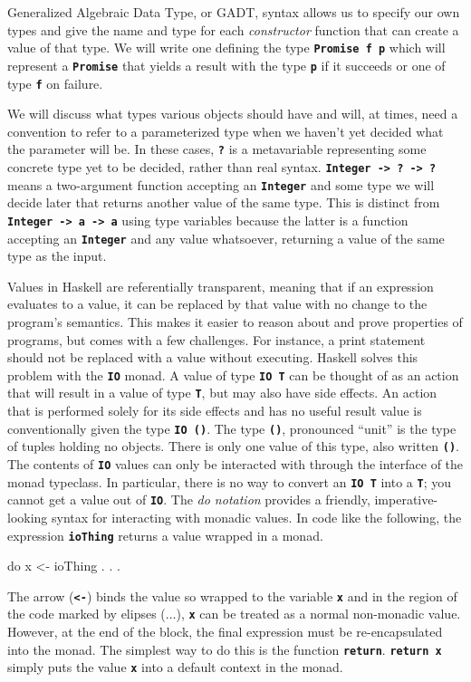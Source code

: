 \documentclass[12pt, english, letterpaper]{kuthesis}
\newcommand{\lit}[1]{\textbf{\texttt{#1}}}
\begin{document}
Generalized Algebraic Data Type, or GADT, syntax allows us to specify our own types and give the name and type for each \emph{constructor} function that can create a value of that type.  We will write one defining the type \lit{Promise f p} which will represent a \lit{Promise} that yields a result with the type \lit p if it succeeds or one of type \lit f on failure.

We will discuss what types various objects should have and will, at times, need a convention to refer to a parameterized type when we haven't yet decided what the parameter will be.  In these cases, \lit ? is a metavariable representing some concrete type yet to be decided, rather than real syntax.  \lit{Integer -> ?\ -> ?} means a two-argument function accepting an \lit{Integer} and some type we will decide later that returns another value of the same type.  This is distinct from \lit{Integer -> a -> a} using type variables because the latter is a function accepting an \lit{Integer} and any value whatsoever, returning a value of the same type as the input.

Values in Haskell are referentially transparent, meaning that if an expression evaluates to a value, it can be replaced by that value with no change to the program's semantics.  This makes it easier to reason about and prove properties of programs, but comes with a few challenges.  For instance, a print statement should not be replaced with a value without executing.  Haskell solves this problem with the \lit{IO} monad.  A value of type \lit{IO T} can be thought of as an action that will result in a value of type \lit T, but may also have side effects.  An action that is performed solely for its side effects and has no useful result value is conventionally given the type \lit{IO ()}.  The type \lit{()}, pronounced ``unit'' is the type of tuples holding no objects.  There is only one value of this type, also written \lit{()}.  The contents of \lit{IO} values can only be interacted with through the interface of the monad typeclass.  In particular, there is no way to convert an \lit{IO T} into a \lit{T}; you cannot get a value out of \lit{IO}.  The \emph{do notation} provides a friendly, imperative-looking syntax for interacting with monadic values.  In code like the following, the expression \lit{ioThing} returns a value wrapped in a monad.
\begin{code}
 do
  x <- ioThing
  . . .
\end{code}
The arrow (\lit{<-}) binds the value so wrapped to the variable \lit x and in the region of the code marked by elipses (\lit{\(\dots\)}), \lit x can be treated as a normal non-monadic value.  However, at the end of the block, the final expression must be re-encapsulated into the monad.  The simplest way to do this is the function \lit{return}.  \lit{return x} simply puts the value \lit x into a default context in the monad.
\end{document}
